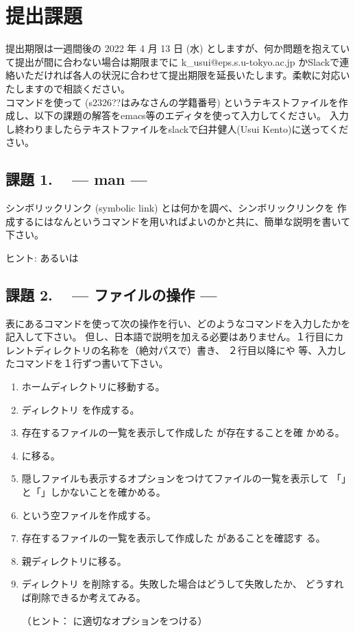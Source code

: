 \documentclass[platex]{jsarticle}
\begin{document}



\newpage
\section{提出課題}
 提出期限は一週間後の 2022 年 4 月 13 日 (水) としますが、何か問題を抱えていて提出が間に合わない場合は期限までに k\_usui@eps.s.u-tokyo.ac.jp かSlackで連絡いただければ各人の状況に合わせて提出期限を延長いたします。柔軟に対応いたしますので相談ください。\\

 コマンドを使って (s2326??はみなさんの学籍番号) というテキストファイルを作成し、以下の課題の解答をemacs等のエディタを使って入力してください。
 入力し終わりましたらテキストファイルをslackで臼井健人(Usui Kento)に送ってください。

 \subsection*{課題 1. ~ --- man ---}
  シンボリックリンク (symbolic link) とは何かを調べ、シンボリックリンクを
  作成するにはなんというコマンドを用いればよいのかと共に、簡単な説明を書いて下さい。

  ヒント:  あるいは 

  
 \subsection*{課題 2. ~ --- ファイルの操作 ---}
 表にあるコマンドを使って次の操作を行い、どのようなコマンドを入力したかを記入して下さい。
 但し、日本語で説明を加える必要はありません。１行目にカレントディレクトリの名称を（絶対パスで）書き、
 ２行目以降にや 等、入力したコマンドを１行ずつ書いて下さい。

 \begin{enumerate}
  \item ホームディレクトリに移動する。
  \item ディレクトリ  を作成する。
  \item 存在するファイルの一覧を表示して作成した  が存在することを確
	かめる。
  \item {} に移る。
  \item 隠しファイルも表示するオプションをつけてファイルの一覧を表示して
	「」と「」しかないことを確かめる。
  \item {} という空ファイルを作成する。
  \item 存在するファイルの一覧を表示して作成した があることを確認す
	る。
  \item 親ディレクトリに移る。
  \item ディレクトリ を削除する。失敗した場合はどうして失敗したか、
	どうすれば削除できるか考えてみる。
	
	（ヒント：  に適切なオプションをつける）
 \end{enumerate}
\end{document}
